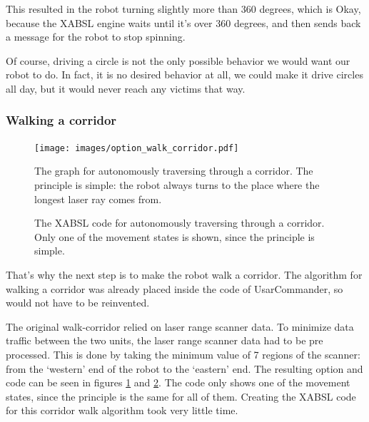 \documentclass[a4paper,10pt]{article}
\begin{document}
This resulted in the robot turning slightly more than 360 degrees, which is
Okay, because the XABSL engine waits until it's over 360 degrees, and then sends
back a message for the robot to stop spinning. 

Of course, driving a circle is not the only possible behavior we would want our
robot to do. In fact, it is no desired behavior at all, we could make it drive
circles all day, but it would never reach any victims that way. 

\subsubsection{Walking a corridor}
\begin{figure}
\centering
\texttt{[image: images/option\_walk\_corridor.pdf]}\\
\caption{The graph for autonomously traversing through a corridor. The
principle is simple: the robot always turns to the place where the longest laser
ray comes from.}
\label{fig:walk-corridor-fig}
\end{figure}
\begin{figure}
\centering
{}
\parbox{1.1\linewidth}{
}
\caption{The XABSL code for autonomously traversing through a corridor. Only one
of the movement states is shown, since the principle is simple.}
\label{fig:walk-corridor-code}
\end{figure}

That's why the next step is to make the robot walk a corridor. The algorithm for
walking a corridor was already placed inside the code of UsarCommander, so
would not have to be reinvented. 

The original walk-corridor relied on laser range scanner data. To minimize data
traffic between the two units, the laser range scanner data had to be pre
processed. This is done by taking the minimum value of 7 regions of the scanner:
from the `western' end of the robot to the `eastern' end. The resulting option
and code can be seen in figures \ref{fig:walk-corridor-fig} and
\ref{fig:walk-corridor-code}. The code only shows one
of the movement states, since the principle is the same for all of them.
Creating the XABSL code for this corridor walk algorithm took very little time.
\end{document}

